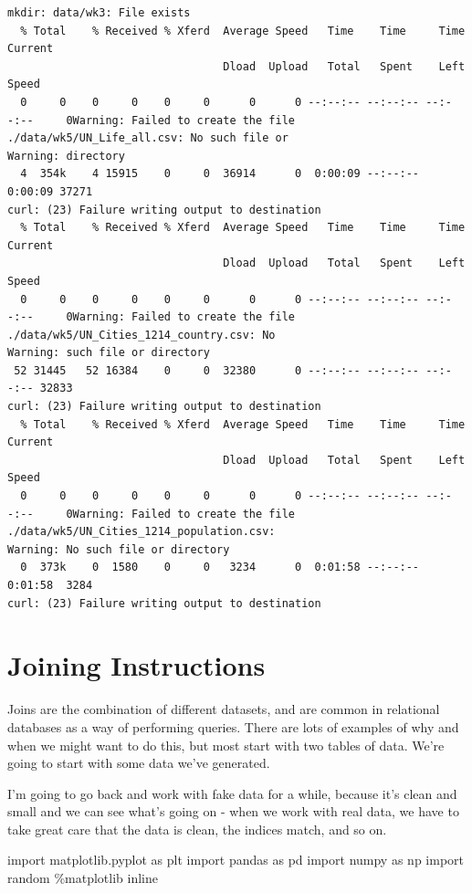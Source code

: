 \documentclass[
  letterpaper,
  DIV=11,
  numbers=noendperiod]{scrreprt}
\newenvironment{Shaded}{\begin{snugshade}}{\end{snugshade}}
\newcommand{\ImportTok}[1]{\textcolor[rgb]{0.00,0.46,0.62}{#1}}
\newcommand{\NormalTok}[1]{\textcolor[rgb]{0.00,0.23,0.31}{#1}}
\newcommand{\OperatorTok}[1]{\textcolor[rgb]{0.37,0.37,0.37}{#1}}
\begin{document}
\begin{verbatim}
mkdir: data/wk3: File exists
  % Total    % Received % Xferd  Average Speed   Time    Time     Time  Current
                                 Dload  Upload   Total   Spent    Left  Speed
  0     0    0     0    0     0      0      0 --:--:-- --:--:-- --:--:--     0Warning: Failed to create the file ./data/wk5/UN_Life_all.csv: No such file or 
Warning: directory
  4  354k    4 15915    0     0  36914      0  0:00:09 --:--:--  0:00:09 37271
curl: (23) Failure writing output to destination
  % Total    % Received % Xferd  Average Speed   Time    Time     Time  Current
                                 Dload  Upload   Total   Spent    Left  Speed
  0     0    0     0    0     0      0      0 --:--:-- --:--:-- --:--:--     0Warning: Failed to create the file ./data/wk5/UN_Cities_1214_country.csv: No 
Warning: such file or directory
 52 31445   52 16384    0     0  32380      0 --:--:-- --:--:-- --:--:-- 32833
curl: (23) Failure writing output to destination
  % Total    % Received % Xferd  Average Speed   Time    Time     Time  Current
                                 Dload  Upload   Total   Spent    Left  Speed
  0     0    0     0    0     0      0      0 --:--:-- --:--:-- --:--:--     0Warning: Failed to create the file ./data/wk5/UN_Cities_1214_population.csv: 
Warning: No such file or directory
  0  373k    0  1580    0     0   3234      0  0:01:58 --:--:--  0:01:58  3284
curl: (23) Failure writing output to destination
\end{verbatim}

\hypertarget{joining-instructions}{%
\section{Joining Instructions}\label{joining-instructions}}

Joins are the combination of different datasets, and are common in
relational databases as a way of performing queries. There are lots of
examples of why and when we might want to do this, but most start with
two tables of data. We're going to start with some data we've generated.

I'm going to go back and work with fake data for a while, because it's
clean and small and we can see what's going on - when we work with real
data, we have to take great care that the data is clean, the indices
match, and so on.

\begin{Shaded}
\begin{Highlighting}[]
\ImportTok{import}\NormalTok{ matplotlib.pyplot }\ImportTok{as}\NormalTok{ plt}
\ImportTok{import}\NormalTok{ pandas }\ImportTok{as}\NormalTok{ pd}
\ImportTok{import}\NormalTok{ numpy }\ImportTok{as}\NormalTok{ np}
\ImportTok{import}\NormalTok{ random}
\OperatorTok{\%}\NormalTok{matplotlib inline}
\end{Highlighting}
\end{Shaded}
\end{document}

